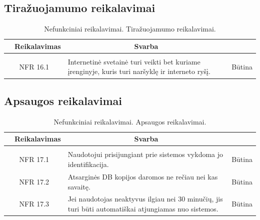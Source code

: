 \documentclass{VUMIFPSkursinis}
\begin{document}
\subsection{Tiražuojamumo reikalavimai}
\begin{table}[H]
	\caption{Nefunkciniai reikalavimai. Tiražuojamumo reikalavimai.}
	\begin{tabular}{|p{1cm}|p{1cm}|p{}|p{}|}
	\hline 
\rowcolor{gray!50}
		\multicolumn{2}{|c|}{{\bfseries Kodas}}&
		\multicolumn{1}{c|}{{\bfseries Reikalavimas}}&
		\multicolumn{1}{c|}{{\bfseries Svarba}}\\
\hline
\rowcolor{lightgray}
\multicolumn{4}{|c|}{Tiražuojamumo reikalavimai}\\		

\hline
	\multicolumn{2}{|c|}{NFR 16.1}&
	{Internetinė svetainė turi veikti bet kuriame įrenginyje, kuris turi naršyklę ir interneto ryšį.
}&		
	\multicolumn{1}{c|}{Būtina}\\
			
	\hline
	\end{tabular}		
	\end{table}
\subsection{Apsaugos reikalavimai}
\begin{table}[H]
	\caption{Nefunkciniai reikalavimai. Apsaugos reikalavimai.}
	\begin{tabular}{|p{1cm}|p{1cm}|p{}|p{}|}
	\hline 
\rowcolor{gray!50}
		\multicolumn{2}{|c|}{{\bfseries Kodas}}&
		\multicolumn{1}{c|}{{\bfseries Reikalavimas}}&
		\multicolumn{1}{c|}{{\bfseries Svarba}}\\
\hline
\rowcolor{lightgray}
\multicolumn{4}{|c|}{Apsaugos reikalavimai}\\		

\hline
	\multicolumn{2}{|c|}{NFR 17.1}&
	{Naudotojui prisijungiant prie sistemos vykdoma jo identifikacija.
}&		
	\multicolumn{1}{c|}{Būtina}\\
	
\hline
	\multicolumn{2}{|c|}{NFR 17.2}&
	{Atsarginės DB kopijos daromos ne rečiau nei kas savaitę.
}&		
	\multicolumn{1}{c|}{Būtina}\\	
	
\hline
	\multicolumn{2}{|c|}{NFR 17.3}&
	{Jei naudotojas neaktyvus ilgiau nei 30 minučių, jis turi būti automatiškai atjungiamas nuo sistemos.
}&		
	\multicolumn{1}{c|}{Būtina}\\		
			
	\hline
	\end{tabular}		
	\end{table}
\end{document}
